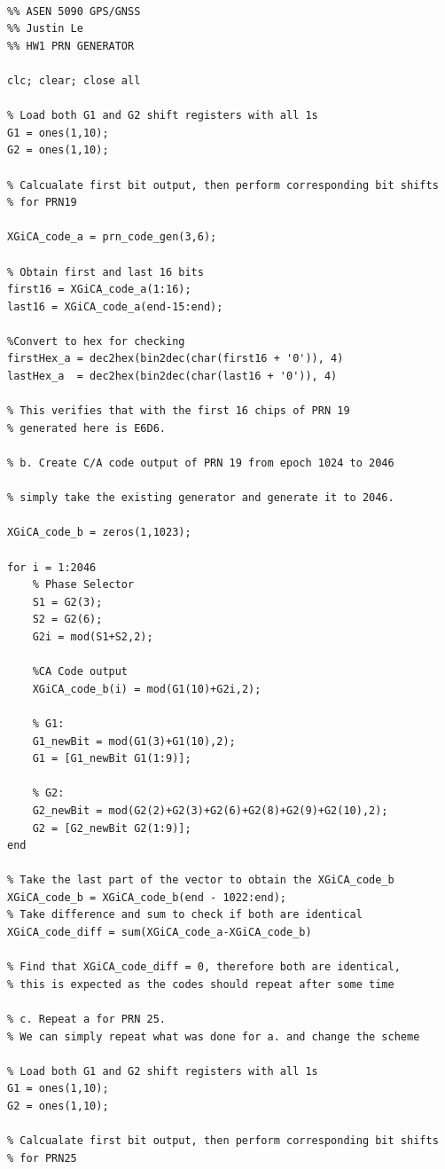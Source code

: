 \documentclass[11pt]{article}
\begin{document}
\newpage

\begin{verbatim}

%% ASEN 5090 GPS/GNSS
%% Justin Le
%% HW1 PRN GENERATOR

clc; clear; close all

% Load both G1 and G2 shift registers with all 1s
G1 = ones(1,10);
G2 = ones(1,10);

% Calcualate first bit output, then perform corresponding bit shifts
% for PRN19

XGiCA_code_a = prn_code_gen(3,6);

% Obtain first and last 16 bits
first16 = XGiCA_code_a(1:16);
last16 = XGiCA_code_a(end-15:end);

%Convert to hex for checking
firstHex_a = dec2hex(bin2dec(char(first16 + '0')), 4)
lastHex_a  = dec2hex(bin2dec(char(last16 + '0')), 4)

% This verifies that with the first 16 chips of PRN 19
% generated here is E6D6.

% b. Create C/A code output of PRN 19 from epoch 1024 to 2046

% simply take the existing generator and generate it to 2046.

XGiCA_code_b = zeros(1,1023);

for i = 1:2046
    % Phase Selector
    S1 = G2(3);
    S2 = G2(6);
    G2i = mod(S1+S2,2);
    
    %CA Code output
    XGiCA_code_b(i) = mod(G1(10)+G2i,2);

    % G1:
    G1_newBit = mod(G1(3)+G1(10),2);
    G1 = [G1_newBit G1(1:9)];
    
    % G2:
    G2_newBit = mod(G2(2)+G2(3)+G2(6)+G2(8)+G2(9)+G2(10),2);
    G2 = [G2_newBit G2(1:9)];
end

% Take the last part of the vector to obtain the XGiCA_code_b
XGiCA_code_b = XGiCA_code_b(end - 1022:end);
% Take difference and sum to check if both are identical
XGiCA_code_diff = sum(XGiCA_code_a-XGiCA_code_b)

% Find that XGiCA_code_diff = 0, therefore both are identical,
% this is expected as the codes should repeat after some time

% c. Repeat a for PRN 25.
% We can simply repeat what was done for a. and change the scheme

% Load both G1 and G2 shift registers with all 1s
G1 = ones(1,10);
G2 = ones(1,10);

% Calcualate first bit output, then perform corresponding bit shifts
% for PRN25


\end{verbatim}
\end{document}
